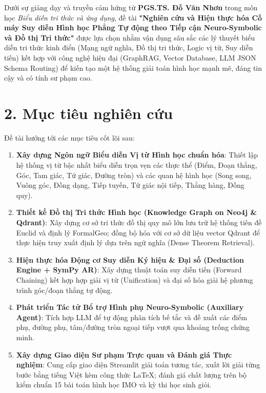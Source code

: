 Dưới sự giảng dạy và truyền cảm hứng từ \textbf{PGS.TS. Đỗ Văn Nhơn} trong môn học \textit{Biểu diễn tri thức và ứng dụng}, đề tài \textbf{"Nghiên cứu và Hiện thực hóa Cỗ máy Suy diễn Hình học Phẳng Tự động theo Tiếp cận Neuro-Symbolic và Đồ thị Tri thức"} được lựa chọn nhằm vận dụng sâu sắc các lý thuyết biểu diễn tri thức kinh điển (Mạng ngữ nghĩa, Đồ thị tri thức, Logic vị từ, Suy diễn tiến) kết hợp với công nghệ hiện đại (GraphRAG, Vector Database, LLM JSON Schema Routing) để kiến tạo một hệ thống giải toán hình học mạnh mẽ, đáng tin cậy và có tính sư phạm cao.

\section*{2. Mục tiêu nghiên cứu}
Đề tài hướng tới các mục tiêu cốt lõi sau:
\begin{enumerate}
    \item \textbf{Xây dựng Ngôn ngữ Biểu diễn Vị từ Hình học chuẩn hóa}: Thiết lập hệ thống vị từ bậc nhất biểu diễn trọn vẹn các thực thể (Điểm, Đoạn thẳng, Góc, Tam giác, Tứ giác, Đường tròn) và các quan hệ hình học (Song song, Vuông góc, Đồng dạng, Tiếp tuyến, Tứ giác nội tiếp, Thẳng hàng, Đồng quy).
    \item \textbf{Thiết kế Đồ thị Tri thức Hình học (Knowledge Graph on Neo4j \& Qdrant)}: Xây dựng cơ sở tri thức đồ thị quy mô lớn lưu trữ hệ thống tiên đề Euclid và định lý FormalGeo; đồng bộ hóa với cơ sở dữ liệu vector Qdrant để thực hiện truy xuất định lý dựa trên ngữ nghĩa (Dense Theorem Retrieval).
    \item \textbf{Hiện thực hóa Động cơ Suy diễn Ký hiệu \& Đại số (Deduction Engine + SymPy AR)}: Xây dựng thuật toán suy diễn tiến (Forward Chaining) kết hợp hợp giải vị từ (Unification) và đại số hóa giải hệ phương trình góc/đoạn thẳng tự động.
    \item \textbf{Phát triển Tác tử Bổ trợ Hình phụ Neuro-Symbolic (Auxiliary Agent)}: Tích hợp LLM để tự động phân tích bế tắc và đề xuất các điểm phụ, đường phụ, tâm/đường tròn ngoại tiếp vượt qua khoảng trống chứng minh.
    \item \textbf{Xây dựng Giao diện Sư phạm Trực quan và Đánh giá Thực nghiệm}: Cung cấp giao diện Streamlit giải toán tương tác, xuất lời giải từng bước bằng tiếng Việt kèm công thức LaTeX; đánh giá chất lượng trên bộ kiểm chuẩn 15 bài toán hình học IMO và kỳ thi học sinh giỏi.
\end{enumerate}

